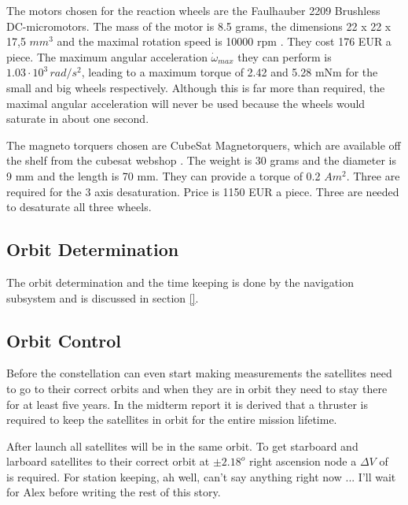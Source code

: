 The motors chosen for the reaction wheels are the Faulhauber 2209 Brushless DC-micromotors. The mass of the motor is 8.5 grams, the dimensions 22 x 22 x 17,5 $mm^3$ and the maximal rotation speed is 10000 rpm \cite{faulhaber}. They cost 176 EUR a piece. The maximum angular acceleration $\dot{\omega}_{max}$ they can perform is $1.03\cdot 10^3\,rad/s^2$, leading to a maximum torque of 2.42 and 5.28 mNm for the small and big wheels respectively. Although this is far more than required, the maximal angular acceleration will never be used because the wheels would saturate in about one second. 

The magneto torquers chosen are CubeSat Magnetorquers, which are available off the shelf from the cubesat webshop \cite{cubesatshop}. The weight is 30 grams and the diameter is 9 mm and the length is 70 mm. They can provide a torque of 0.2 $Am^2$. Three are required for the 3 axis desaturation. Price is 1150 EUR a piece. Three are needed to desaturate all three wheels.


\subsection{Orbit Determination}
\label{subsec:ODS}
The orbit determination and the time keeping is done by the navigation subsystem and is discussed in section \ref{}. %


\subsection{Orbit Control}
\label{subsec:OCS}
Before the constellation can even start making measurements the satellites need to go to their correct orbits and when they are in orbit they need to stay there for at least five years. In the midterm report it is derived that a thruster is required to keep the satellites in orbit for the entire mission lifetime. 

After launch all satellites will be in the same orbit. To get starboard and larboard satellites to their correct orbit at $\pm 2.18^o$ right ascension node a $\Delta V$ of 
\begin{equation}
\end{equation}
is required. For station keeping, ah well, can't say anything right now ...
I'll wait for Alex before writing the rest of this story. 

